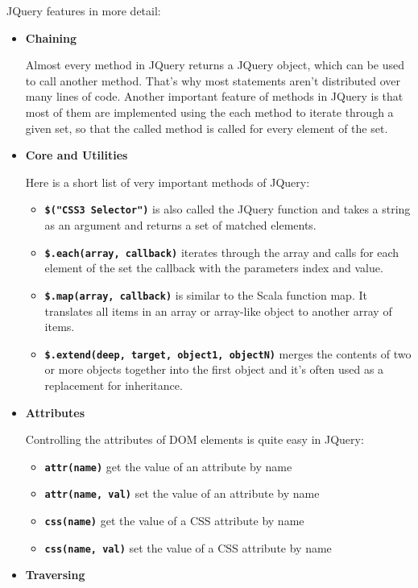     JQuery features in more detail:
    \begin{itemize}
        \item \textbf{Chaining}

            Almost every method in JQuery returns a JQuery object, which can be used to call another method. That's why most statements aren't distributed over many lines of code. Another important feature of methods in JQuery is that most of them are implemented using the each method to iterate through a given set, so that the called method is called for every element of the set.
        \item \textbf{Core and Utilities}

            Here is a short list of very important methods of JQuery:

            \begin{itemize}
                \item \textbf{\lstinline!$("CSS3 Selector")!}
                    is also called the JQuery function and takes a string as an argument and returns a set of matched elements.
                \item \textbf{\lstinline!$.each(array, callback)!}
                    iterates through the array and calls for each element of the set the callback with the parameters index and value.
                \item \textbf{\lstinline!$.map(array, callback)!}
                    is similar to the Scala function map. It translates all items in an array or array-like object to another array of items.
                \item \textbf{\lstinline!$.extend(deep, target, object1, objectN)!}
                    merges the contents of two or more objects together into the first object and it's often used as a replacement for inheritance.
            \end{itemize}
        \item \textbf{Attributes}

            Controlling the attributes of DOM elements is quite easy in JQuery:

            \begin{itemize}
                \item \textbf{\lstinline!attr(name)!}
                    get the value of an attribute by name
                \item \textbf{\lstinline!attr(name, val)!}
                    set the value of an attribute by name
                \item \textbf{\lstinline!css(name)!}
                    get the value of a CSS attribute by name
                \item \textbf{\lstinline!css(name, val)!}
                    set the value of a CSS attribute by name
            \end{itemize}
        \item \textbf{Traversing}


\end{itemize}
